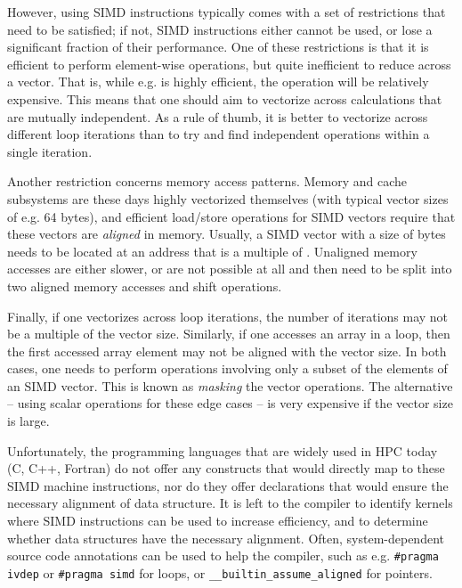 \documentclass[conference]{IEEEtran}
\begin{document}
However, using SIMD instructions typically comes with a set of
restrictions that need to be satisfied; if not, SIMD instructions
either cannot be used, or lose a significant fraction of their
performance. One of these restrictions is that it is efficient to
perform element-wise operations, but quite inefficient to reduce
across a vector. That is, while e.g.  is highly
efficient, the operation  will be relatively expensive.
This means that one should aim to vectorize across calculations that
are mutually independent. As a rule of thumb, it is better to
vectorize across different loop iterations than to try and find
independent operations within a single iteration.

Another restriction concerns memory access patterns. Memory and cache
subsystems are these days highly vectorized themselves (with
typical vector sizes of e.g. 64 bytes), and efficient
load/store operations for SIMD vectors require that these vectors are
\emph{aligned} in memory. Usually, a SIMD vector with a size of 
bytes needs to be located at an address that is a multiple of .
Unaligned memory accesses are either slower, or are not possible at
all and then need to be split into two aligned memory accesses and
shift operations.

Finally, if one vectorizes across loop iterations, the number of
iterations may not be a multiple of the vector size. Similarly, if one
accesses an array in a loop, then the first accessed array element may
not be aligned with the vector size. In both cases, one needs to
perform operations involving only a subset of the elements of an SIMD
vector. This is known as \emph{masking} the vector operations. The
alternative -- using scalar operations for these edge cases --
is very expensive if the vector size is large.

Unfortunately, the programming languages that are widely used in HPC today
(C, C++, Fortran) do not offer any constructs that would directly map
to these SIMD machine instructions, nor do they offer declarations
that would ensure the necessary alignment of data structure. It is
left to the compiler to identify kernels where SIMD instructions can
be used to increase efficiency, and to determine whether data
structures have the necessary alignment.
Often,
system-dependent source code annotations can be used to help the
compiler, such as e.g. \verb+#pragma ivdep+ or \verb+#pragma simd+ for
loops, or \verb+__builtin_assume_aligned+ for pointers.
\end{document}
